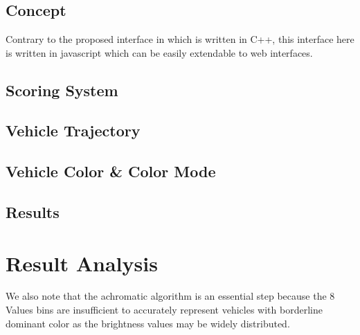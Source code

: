 

\section{\versionTwo}

\subsection{Concept}

Contrary to the proposed interface in \versionOne which is written in C++, this interface here is written in javascript which can be easily extendable to web interfaces.

\subsection{Scoring System}
\subsection{Vehicle Trajectory}
\subsection{Vehicle Color \& Color Mode}
\subsection{Results}

\section{Result Analysis}
We also note that the achromatic algorithm is an essential step because the 8 Values bins are insufficient to accurately represent vehicles with borderline dominant color as the brightness values may be widely distributed.





